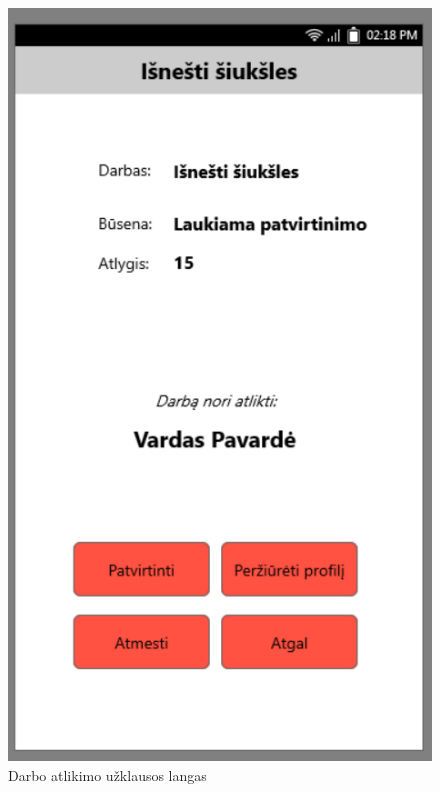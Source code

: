 \documentclass{VUMIFPSbakalaurinis}
\begin{document}
\begin{figure}[H]
	\centering
	\includegraphics[scale=0.4]{img/ScreenShots/2}
	\caption{Darbo atlikimo užklausos langas}
	\label{img:selected job 2}
\end{figure}
\end{document}
